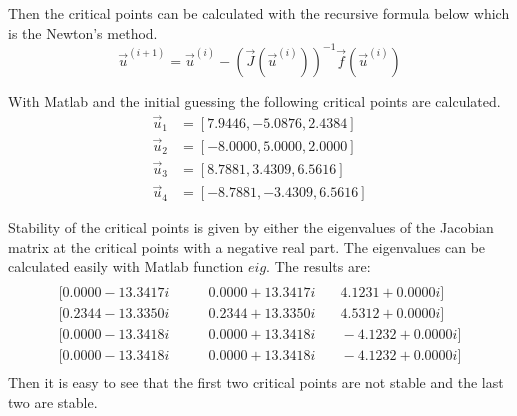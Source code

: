 \documentclass[11pt,a4paper,roman]{scrartcl}
\begin{document}
Then the critical points can be calculated with the recursive formula below which is the Newton's method. 
\begin{equation}
\vec{u}^{(i+1)} = \vec{u}^{(i)}−(\vec{J}(\vec{u}^{(i)}))^{-1} \vec{f}(\vec{u}^{(i)})
\end{equation}

With Matlab and the initial guessing the following critical points are calculated.
\begin{equation}
\begin{aligned}
\vec{u}_1 & = [7.9446  , -5.0876  ,  2.4384] \\
\vec{u}_2 & = [-8.0000  ,  5.0000  ,  2.0000] \\
\vec{u}_3 & = [8.7881  ,  3.4309  ,  6.5616] \\
\vec{u}_4 & = [-8.7881 ,  -3.4309  ,  6.5616] 
\end{aligned}
\end{equation}

Stability of the critical points is given by either the eigenvalues of the Jacobian matrix at the critical points with a negative real part. The eigenvalues can be calculated easily with Matlab function $eig$. The results are:
\begin{equation}
\begin{aligned}
\\
   [0.0000 -13.3417i & \qquad  0.0000 +13.3417i & \quad  4.1231 + 0.0000i] \\
   [0.2344 -13.3350i & \qquad  0.2344 +13.3350i & \quad  4.5312 + 0.0000i] \\
   [0.0000 -13.3418i & \qquad  0.0000 +13.3418i & \quad -4.1232 + 0.0000i] \\
   [0.0000 -13.3418i & \qquad  0.0000 +13.3418i & \quad -4.1232 + 0.0000i] \\
\end{aligned}
\end{equation}
Then it is easy to see that the first two critical points are not stable and the last two are stable. 
\end{document}
